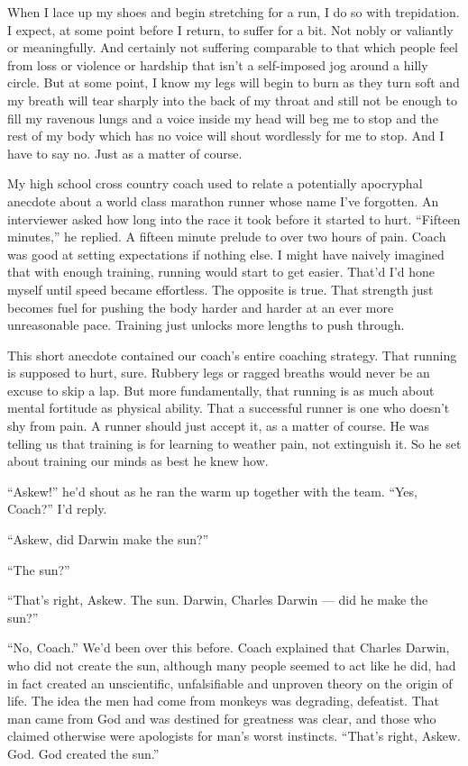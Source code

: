 \documentclass[12pt, oneside]{memoir}
\begin{document}
When I lace up my shoes and begin stretching for a run, I do so with
trepidation.
I expect, at some point before I return, to suffer for a bit.
Not nobly or valiantly or meaningfully.
And certainly not suffering comparable to that which people feel from
loss or violence or hardship that isn't a self-imposed jog around a
hilly circle.
But at some point, I know my legs will begin to burn as they turn
soft and my breath will tear sharply into the back of my throat and
still not be enough to fill my ravenous lungs and a voice inside my
head will beg me to stop and the rest of my body which has no voice
will shout wordlessly for me to stop.
And I have to say no.
Just as a matter of course.

My high school cross country coach used to relate a potentially
apocryphal anecdote about a world class marathon runner whose name
I've forgotten.
An interviewer asked how long into the race it took before it started
to hurt.
``Fifteen minutes,'' he replied.
A fifteen minute prelude to over two hours of pain.
Coach was good at setting expectations if nothing else.
I might have naively imagined that with enough training,
running would start to get easier.
That'd I'd hone myself until speed became effortless.
The opposite is true.
That strength just becomes fuel for pushing the body harder and harder
at an ever more unreasonable pace.
Training just unlocks more lengths to push through.

This short anecdote contained our coach's entire coaching strategy.
That running is supposed to hurt, sure.
Rubbery legs or ragged breaths would never be an excuse to skip a lap.
But more fundamentally, that running is as much about mental
fortitude as physical ability.
That a successful runner is one who doesn't shy from pain.
A runner should just accept it, as a matter of course.
He was telling us that training is for learning to weather pain, not
extinguish it.
So he set about training our minds as best he knew how.

``Askew!'' he'd shout as he ran the warm up together with the team.
``Yes, Coach?'' I'd reply.

``Askew, did Darwin make the sun?''

``The sun?''

``That's right, Askew. The sun. Darwin, Charles Darwin --- did he make
the sun?''

``No, Coach.'' We'd been over this before.
Coach explained that Charles Darwin, who did not create the sun,
although many people seemed to act like he did, had in fact created an
unscientific, unfalsifiable and unproven theory on the origin of life.
The idea the men had come from monkeys was degrading, defeatist.
That man came from God and was destined for greatness was clear, and
those who claimed otherwise were apologists for man's worst instincts.
``That's right, Askew. God. God created the sun.''
\end{document}
